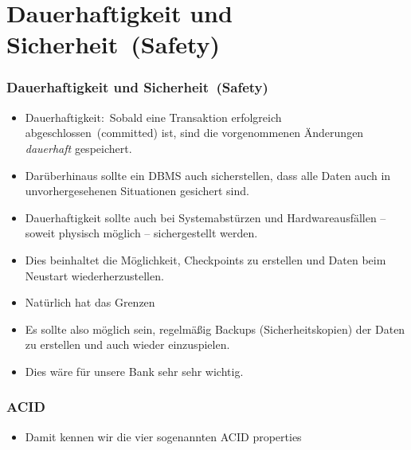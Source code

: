 \documentclass[aspectratio=169,mathserif,notheorems]{beamer}%
\begin{document}
\section{Dauerhaftigkeit und Sicherheit~(Safety)}%
\begin{frame}%
\frametitle{Dauerhaftigkeit und Sicherheit~(Safety)}
\begin{itemize}%
\item \alert{Dauerhaftigkeit}:~Sobald eine Transaktion erfolgreich abgeschlossen~(committed) ist, sind die vorgenommenen Änderungen \emph{dauerhaft} gespeichert.%
\item<2-> Darüberhinaus sollte ein DBMS auch sicherstellen, dass alle Daten auch in unvorhergesehenen Situationen gesichert sind.%
\item<3-> Dauerhaftigkeit sollte auch bei Systemabstürzen und Hardwareausfällen -- soweit physisch möglich -- sichergestellt werden.%
\item<4-> Dies beinhaltet die Möglichkeit, Checkpoints zu erstellen und Daten beim Neustart wiederherzustellen.%
\item<5-> Natürlich hat das Grenzen%
\item<7-> Es sollte also möglich sein, regelmäßig Backups (Sicherheitskopien) der Daten zu erstellen und auch wieder einzuspielen.%
\item<8-> Dies wäre für unsere Bank sehr sehr wichtig.%
\end{itemize}%
\end{frame}%

\begin{frame}%
\frametitle{ACID}
\begin{itemize}%
\item Damit kennen wir die vier sogenannten \alert{ACID properties}\cite{GR1992TPCAT,WV2001TISTAATPOCCAR}%
\end{itemize}%
\end{frame}%
%
\end{document}
